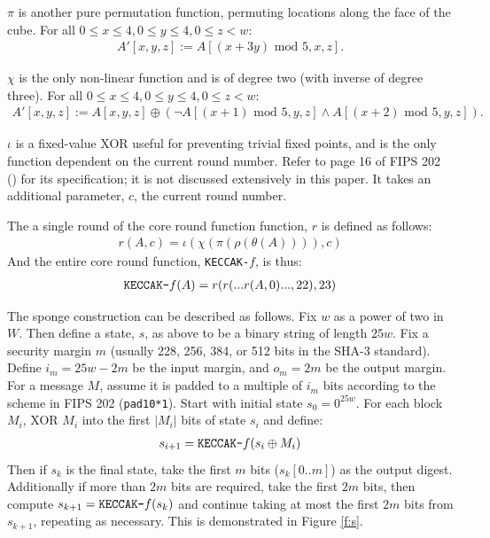 \documentclass[10pt,twocolumn,twoside]{pnas-new}
\begin{document}
    $\pi$ is another pure permutation function, permuting locations along the
face of the cube. For all $0 \leq x \leq 4, 0 \leq y \leq 4, 0 \leq z < w$:
\begin{align*}
    A'[x, y, z] := A[(x + 3y) \text{ mod } 5, x, z].
\end{align*}

    $\chi$ is the only non-linear function and is of degree two (with inverse
of degree three). For all $0 \leq x \leq 4, 0 \leq y \leq 4, 0 \leq z < w$:
\begin{align*}
    A'[x, y, z] := A[x, y, z] \oplus (\lnot A[(x + 1) \text{ mod } 5, y, z] \land A[(x + 2) \text{ mod } 5, y, z]).
\end{align*}

    $\iota$ is a fixed-value XOR useful for preventing trivial fixed points,
and is the only function dependent on the current round number. Refer to
page 16 of FIPS 202 (\cite{NIST202}) for its specification; it is not discussed
extensively in this paper. It takes an additional parameter, $c$, the current
round number.

    The a single round of the core round function function, $r$ is defined as
follows:
\begin{align*}
    r(A, c) = \iota(\chi(\pi(\rho(\theta(A)))), c)
\end{align*}
And the entire core round function, \texttt{KECCAK-$f$}, is thus:
\begin{align*}
    \text{\texttt{KECCAK-$f$}}(A) = r(r( ...  r(A, 0) ... , 22), 23)
\end{align*}

    The sponge construction can be described as follows. Fix $w$ as a power of
two in $W$. Then define a state, $s$, as above to be a binary string of length
$25w$. Fix a security margin $m$ (usually 228, 256, 384, or 512 bits in the
SHA-3 standard). Define $i_{m} = 25w - 2m$ be the input margin, and
$o_{m} = 2m$ be the output margin. For a message $M$, assume it is padded
to a multiple of $i_{m}$ bits according to the scheme in FIPS 202
(\texttt{pad10*1}). Start with initial state $s_0 = 0^{25w}$. For each block
$M_{i}$, XOR $M_{i}$ into the first $|M_{i}|$ bits of state $s_i$ and define:
\begin{align*}
    s_{i+1} = \text{\texttt{KECCAK-$f$}}(s_{i} \oplus M_{i})
\end{align*}
Then if $s_{k}$ is the final state, take the first $m$ bits ($s_{k}[0..m]$)
as the output digest. Additionally if more than $2m$ bits are required, take
the first $2m$ bits, then compute $s_{k+1} = \text{\texttt{KECCAK-$f$}}(s_{k})$
and continue taking at most the first $2m$ bits from $s_{k+1}$, repeating as
necessary. This is demonstrated in Figure \ref{f:s}.
\end{document}
